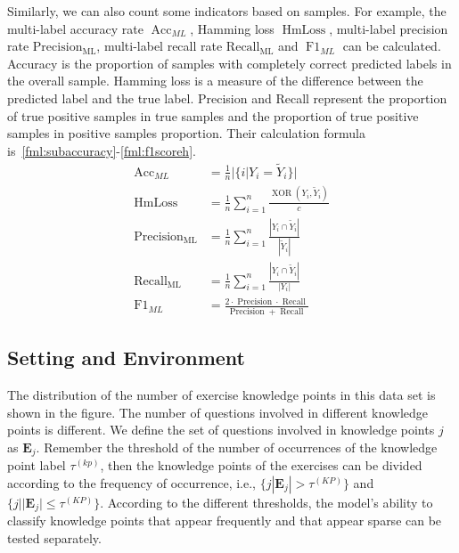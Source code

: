 Similarly, we can also count some indicators based on samples. For example, the multi-label accuracy rate \(\operatorname{Acc}_{ML}\), Hamming loss \(\operatorname{HmLoss}\), multi-label precision rate \(\operatorname{Precision_{ML}}\), multi-label recall rate \(\operatorname{Recall_{ML}}\) and \(\operatorname{F1}_{ML}\) can be calculated. Accuracy is the proportion of samples with completely correct predicted labels in the overall sample. Hamming loss is a measure of the difference between the predicted label and the true label. Precision and Recall represent the proportion of true positive samples in true samples and the proportion of true positive samples in positive samples proportion. Their calculation formula is~\ref{fml:subaccuracy}-\ref{fml:f1scoreh}.
\begin{align}
	\operatorname{Acc}_{ML}       & =\frac{1}{n} |\{i|Y_i=\tilde{Y}_i\}| \label{fml:subaccuracy}                                                                              \\
	\operatorname{HmLoss}         & =\frac{1}{n} \sum_{i=1}^{n} \frac{\operatorname{XOR}(Y_i,\tilde{Y}_i)}{c} \label{fml:hmloss}                                              \\
	\operatorname{Precision_{ML}} & =\frac{1}{n} \sum_{i=1}^{n} \frac{|Y_{i} \cap \tilde{Y}_i|}{|\tilde{Y}_i|} \label{fml:Precisionh}                                         \\
	\operatorname{Recall_{ML}}    & =\frac{1}{n} \sum_{i=1}^{n} \frac{|Y_{i} \cap \tilde{Y}_i|}{|Y_{i}|}    \label{fml:Recallh}                                               \\
	\operatorname{F1}_{ML}        & =\frac{2 \cdot \operatorname{Precision} \cdot \operatorname{Recall}}{\operatorname{Precision}+\operatorname{Recall}} \label{fml:f1scoreh}
\end{align}

\subsection{Setting and Environment}
The distribution of the number of exercise knowledge points in this data set is shown in the figure. The number of questions involved in different knowledge points is different. We define the set of questions involved in knowledge points \(j\) as \(\mathbf{E}_j\). Remember the threshold of the number of occurrences of the knowledge point label \(\tau^{(kp)} \), then the knowledge points of the exercises can be divided according to the frequency of occurrence, i.e., \( \{j|\mathbf{E}_j|>\tau^{(KP)}\} \) and \( \{j||\mathbf{E}_j|\leq\tau^{(KP)} \} \). According to the different thresholds, the model's ability to classify knowledge points that appear frequently and that appear sparse can be tested separately.

